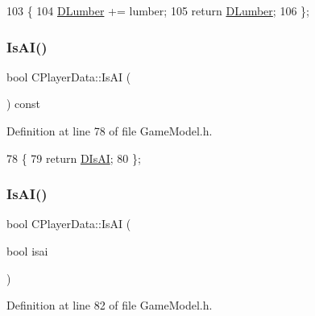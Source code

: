 \begin{DoxyCode}
103                                        \{
104             \hyperlink{classCPlayerData_adf3bf2fa49b5c8a4fb9a478d95f688c4}{DLumber} += lumber;
105             \textcolor{keywordflow}{return} \hyperlink{classCPlayerData_adf3bf2fa49b5c8a4fb9a478d95f688c4}{DLumber};  
106         \};
\end{DoxyCode}
\hypertarget{classCPlayerData_ac68129067db822343e68b307de53e11c}{}\label{classCPlayerData_ac68129067db822343e68b307de53e11c} 
\subsubsection{\texorpdfstring{Is\+A\+I()}{IsAI()}\hspace{0.1cm}{\footnotesize\ttfamily [1/2]}}
{\footnotesize\ttfamily bool C\+Player\+Data\+::\+Is\+AI (\begin{DoxyParamCaption}{ }\end{DoxyParamCaption}) const\hspace{0.3cm}{\ttfamily [inline]}}



Definition at line 78 of file Game\+Model.\+h.


\begin{DoxyCode}
78                          \{
79             \textcolor{keywordflow}{return} \hyperlink{classCPlayerData_ad3fcb8740d4e37b4654c01c8c595e6d5}{DIsAI};
80         \};
\end{DoxyCode}
\hypertarget{classCPlayerData_a20d6aa66a3483ad16052b0afea928ec6}{}\label{classCPlayerData_a20d6aa66a3483ad16052b0afea928ec6} 
\subsubsection{\texorpdfstring{Is\+A\+I()}{IsAI()}\hspace{0.1cm}{\footnotesize\ttfamily [2/2]}}
{\footnotesize\ttfamily bool C\+Player\+Data\+::\+Is\+AI (\begin{DoxyParamCaption}\item[{bool}]{isai }\end{DoxyParamCaption})\hspace{0.3cm}{\ttfamily [inline]}}



Definition at line 82 of file Game\+Model.\+h.


